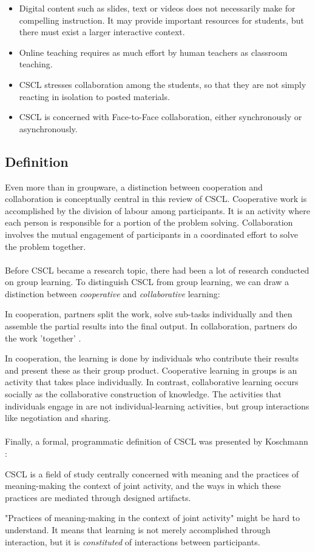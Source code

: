 \begin{itemize}
\item{Digital content such as slides, text or videos does not necessarily make for compelling instruction. It may provide important resources for students, but there must exist a larger interactive context.}
\item{Online teaching requires as much effort by human teachers as classroom teaching.}
\item{CSCL stresses collaboration among the students, so that they are not simply reacting in isolation to posted materials.}
\item{CSCL is concerned with Face-to-Face collaboration, either synchronously or asynchronously.}
\end{itemize}

\subsection{Definition}

Even more than in groupware, a distinction between cooperation and collaboration is conceptually central in this review of CSCL. Cooperative work is accomplished by the division of labour among participants. It is an activity where each person is responsible for a portion of the problem solving. Collaboration involves the mutual engagement of participants in a coordinated effort to solve the problem together.
\\ \\
Before CSCL became a research topic, there had been a lot of research conducted on group learning. To distinguish CSCL from group learning, we can draw a distinction between \textit{cooperative} and \textit{collaborative} learning:

\begin{mydef}
In cooperation, partners split the work, solve sub-tasks individually and then assemble the partial results into the final output. In collaboration, partners do the work 'together' \cite {DefinitionCSCL}.
\end{mydef}

In cooperation, the learning is done by individuals who contribute their results and present these as their group product. Cooperative learning in groups is an activity that takes place individually. In contrast, collaborative learning occurs socially as the collaborative construction of knowledge. The activities that individuals engage in are not individual-learning activities, but group interactions like negotiation and sharing.
\\ \\
Finally, a formal, programmatic definition of CSCL was presented by Koschmann \cite{CSCLDefinition2}:
\begin{mydef}
CSCL is a field of study centrally concerned with meaning and the practices of meaning-making the context of joint activity, and the ways in which these practices are mediated through designed artifacts.
\end{mydef}
"Practices of meaning-making in the context of joint activity" might be hard to understand. It means that learning is not merely accomplished through interaction, but it is \textit{constituted} of interactions between participants. 


